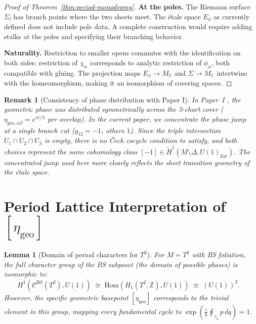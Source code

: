 \documentclass[11pt]{article}
\newtheorem{lemma}[theorem]{Lemma}
\newtheorem{remark}[theorem]{Remark}
\begin{document}
\begin{proof}[Proof of Theorem~\ref{thm:period-monodromy}]
\textbf{At the poles.} The Riemann surface $\Sigma_l$ has branch points
where the two sheets meet. The étale space $E_\phi$ as currently defined
does not include pole data. A complete construction would require adding
stalks at the poles and specifying their branching behavior.

\medskip
\textbf{Naturality.} Restriction to smaller opens commutes with the
identification on both sides: restriction of $\chi_\alpha$ corresponds
to analytic restriction of $\phi_\alpha$, both compatible with gluing.
The projection maps $E_\phi \to M_\mathbb{C}$ and $\Sigma \to M_\mathbb{C}$
intertwine with the homeomorphism, making it an isomorphism of covering
spaces.
\end{proof}

\begin{remark}[Consistency of phase distribution with Paper I]
In Paper~I \cite{PaperI}, the geometric phase was distributed symmetrically across the 3-chart cover ($\eta_{\mathrm{geo},\alpha\beta} = e^{i\pi/3}$ per overlap). In the current paper, we concentrate the phase jump at a single branch cut ($g_{12} = -1$, others $1$). Since the triple intersection $U_1 \cap U_2 \cap U_3$ is empty, there is no \v{C}ech cocycle condition to satisfy, and both choices represent the same cohomology class $[-1] \in \check{H}^1(M \setminus \Delta, U(1)_{\mathrm{flat}})$. The concentrated jump used here more clearly reflects the sheet transition geometry of the \'etale space.
\end{remark}

\section{Period Lattice Interpretation of $[\eta_{\mathrm{geo}}]$}
\label{sec:period}

\begin{lemma}[Domain of period characters for $T^2$]
\label{lem:identification}
For $M = T^2$ with BS foliation, the full character group of the BS subposet (the domain of possible phases) is isomorphic to:
\[
  H^1(\mathcal{C}^{\mathrm{BS}}(T^2), \underline{U(1)})
  \;\cong\;
  \mathrm{Hom}(H_1(T^2, \mathbb{Z}), U(1))
  \;\cong\;
  (U(1))^2.
\]
However, the \emph{specific} geometric basepoint $[\eta_{\mathrm{geo}}]$ corresponds to the trivial element in this group, mapping every fundamental cycle to $\exp(\tfrac{i}{\hbar}\oint_{\gamma_k} p\,dq) = 1$.
\end{lemma}
\end{document}
